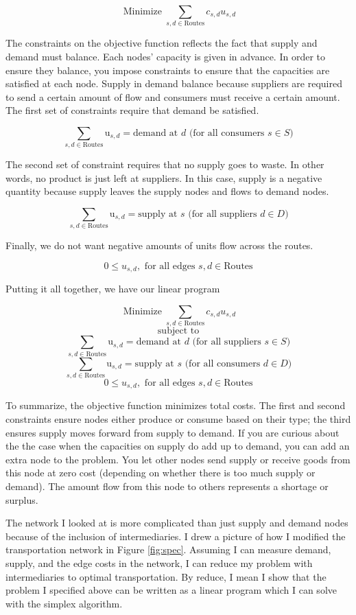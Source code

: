\documentclass{report}
\begin{document}
$$\operatorname{Minimize} \sum_{s,d \in \text{Routes}} c_{s,d} u_{s,d}$$

The constraints on the objective function reflects the fact that supply and demand must balance. Each nodes' capacity is given in advance. In order to ensure they balance, you impose constraints to ensure that the capacities are satisfied at each node. Supply in demand balance because suppliers are required to send a certain amount of flow and consumers must receive a certain amount. The first set of constraints require that demand be satisfied.

$$\sum_{s,d \in \text{Routes}} \text{u}_{s,d}= \text{demand at } d \text{ (for all consumers } s \in S)$$

The second set of constraint requires that no supply goes to waste. In other words, no product is just left at suppliers. In this case, supply is a negative quantity because supply leaves the supply nodes and flows to demand nodes.

$$\sum_{s,d \in \text{Routes}} \text{u}_{s,d}= \text{supply at } s \text{ (for all suppliers } d \in D)$$

Finally, we do not want negative amounts of units flow across the routes.

$$0 \leq u_{s,d},  \text{ for all edges } s,d \in \text{Routes}$$

Putting it all together, we have our linear program

$$\operatorname{Minimize} \sum_{s,d \in \text{Routes}} c_{s,d} u_{s,d}$$
$$\text{subject to}$$
$$\sum_{s,d \in \text{Routes}} \text{u}_{s,d}= \text{demand at } d \text{ (for all suppliers } s \in S)$$
$$\sum_{s,d \in \text{Routes}} \text{u}_{s,d}= \text{supply at } s \text{ (for all consumers } d \in D)$$
$$0 \leq u_{s,d}, \text{ for all edges } s,d \in \text{Routes}$$

To summarize, the objective function minimizes total costs. The first and second constraints ensure nodes either produce or consume based on their type; the third ensures supply moves forward from supply to demand.  If you are curious about the the case when the capacities on supply do add up to demand, you can add an extra node to the problem. You let other nodes send supply or receive goods from this node at zero cost (depending on whether there is too much supply or demand). The amount flow from this node to others represents a shortage or surplus.


The network I looked at is more complicated than just supply and demand nodes because of the inclusion of intermediaries. I drew a picture of how I modified the transportation network in Figure \ref{fig:spec}. Assuming I can measure demand, supply, and the edge costs in the network, I can reduce my problem with intermediaries to optimal transportation. By reduce, I mean I show that the problem I specified above can be written as a linear program which I can solve with the simplex algorithm. 
\end{document}
